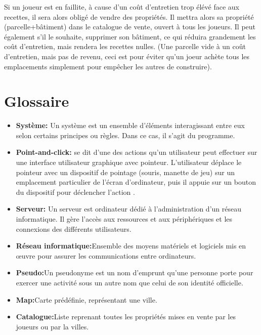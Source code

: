 \documentclass[a4paper,11pt]{report}
\begin{document}
Si un joueur est en faillite, à cause d'un coût d'entretien trop élévé face aux recettes, il sera alors obligé de vendre des propriétés. Il mettra alors sa propriété (parcelle+bâtiment) dans le catalogue de vente, ouvert à tous les joueurs.
Il peut également s'il le souhaite, supprimer son bâtiment, ce qui réduira grandement les coût d'entretien, mais rendera les recettes nulles. (Une parcelle vide à un coût d'entretien, mais pas de revenu, ceci est pour éviter qu'un joeur achète tous les emplacements simplement pour empêcher les autres de construire).

\newpage
\section{Glossaire}
\begin{itemize}
 \item \textbf{Système:} Un système est un ensemble d'éléments interagissant entre eux selon certains principes ou règles. Dans ce cas, il s’agit du programme.
 \item \textbf{Point-and-click:} se dit d’une des actions qu'un utilisateur peut effectuer sur une interface utilisateur graphique avec pointeur.
L'utilisateur déplace le pointeur avec un dispositif de pointage (souris, manette de jeu) sur un emplacement particulier de l'écran d'ordinateur,
puis il appuie sur un bouton du dispositif pour déclencher l'action .
 \item \textbf{Serveur:} Un serveur est ordinateur dédié à l'administration d'un réseau informatique. Il gère l'accès aux ressources et aux périphériques et les connexions des différents utilisateurs.
 \item \textbf{Réseau informatique:}Ensemble des moyens matériels et logiciels mis en œuvre pour assurer les communications entre ordinateurs.
 \item \textbf{Pseudo:}Un pseudonyme est un nom d'emprunt qu'une personne porte pour exercer une activité sous un autre nom que celui de son identité officielle.
 \item \textbf{Map:}Carte prédéfinie, représentant une ville.
 \item \textbf{Catalogue:}Liste reprenant toutes les propriétés mises en vente par les joueurs ou par la villes.
\end{itemize}

\newpage
\end{document}
